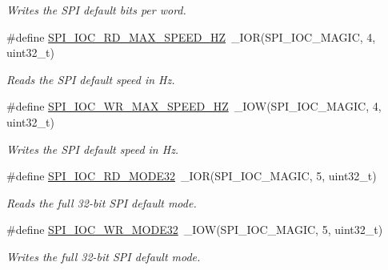\begin{DoxyCompactItemize}
\begin{DoxyCompactList}\small\item\em Writes the S\+PI default bits per word. \end{DoxyCompactList}\item 
\mbox{\label{group__SPILinux_ga830bbc92f84481aa16378a0cbbe9b347}} 
\#define \mbox{\hyperlink{group__SPILinux_ga830bbc92f84481aa16378a0cbbe9b347}{S\+P\+I\+\_\+\+I\+O\+C\+\_\+\+R\+D\+\_\+\+M\+A\+X\+\_\+\+S\+P\+E\+E\+D\+\_\+\+HZ}}~\+\_\+\+I\+OR(S\+P\+I\+\_\+\+I\+O\+C\+\_\+\+M\+A\+G\+IC, 4, uint32\+\_\+t)
\begin{DoxyCompactList}\small\item\em Reads the S\+PI default speed in Hz. \end{DoxyCompactList}\item 
\mbox{\label{group__SPILinux_gaaff3174fce4c0d179bd2d8a1f2572383}} 
\#define \mbox{\hyperlink{group__SPILinux_gaaff3174fce4c0d179bd2d8a1f2572383}{S\+P\+I\+\_\+\+I\+O\+C\+\_\+\+W\+R\+\_\+\+M\+A\+X\+\_\+\+S\+P\+E\+E\+D\+\_\+\+HZ}}~\+\_\+\+I\+OW(S\+P\+I\+\_\+\+I\+O\+C\+\_\+\+M\+A\+G\+IC, 4, uint32\+\_\+t)
\begin{DoxyCompactList}\small\item\em Writes the S\+PI default speed in Hz. \end{DoxyCompactList}\item 
\mbox{\label{group__SPILinux_gaf19921d03ad39e39933c566daaeb017b}} 
\#define \mbox{\hyperlink{group__SPILinux_gaf19921d03ad39e39933c566daaeb017b}{S\+P\+I\+\_\+\+I\+O\+C\+\_\+\+R\+D\+\_\+\+M\+O\+D\+E32}}~\+\_\+\+I\+OR(S\+P\+I\+\_\+\+I\+O\+C\+\_\+\+M\+A\+G\+IC, 5, uint32\+\_\+t)
\begin{DoxyCompactList}\small\item\em Reads the full 32-\/bit S\+PI default mode. \end{DoxyCompactList}\item 
\mbox{\label{group__SPILinux_ga2bc460b2331b19394e0137ebfe77d7bf}} 
\#define \mbox{\hyperlink{group__SPILinux_ga2bc460b2331b19394e0137ebfe77d7bf}{S\+P\+I\+\_\+\+I\+O\+C\+\_\+\+W\+R\+\_\+\+M\+O\+D\+E32}}~\+\_\+\+I\+OW(S\+P\+I\+\_\+\+I\+O\+C\+\_\+\+M\+A\+G\+IC, 5, uint32\+\_\+t)
\begin{DoxyCompactList}\small\item\em Writes the full 32-\/bit S\+PI default mode. \end{DoxyCompactList}\end{DoxyCompactItemize}
